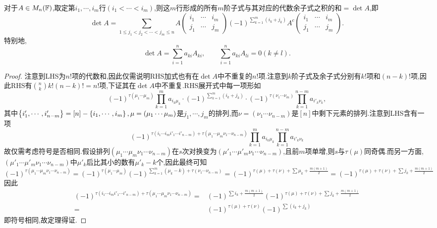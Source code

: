 \documentclass[openany]{book}
\begin{document}
\begin{theorem}[Lapalce展开定理]对于$A\in M_n(\mathbb{F})$,取定第$i_1,\cdots,i_m$行$(i_1<\cdots<i_m)$,则这$m$行形成的所有$m$阶子式与其对应的代数余子式之积的和$=\det A$,即
    $$\det A=\sum_{1\leq j_1<j_2<\cdots<j_m\leq n}A\begin{pmatrix}
    i_1&\cdots&i_m\\j_1&\cdots&j_m
\end{pmatrix}(-1)^{\sum_{k=1}^m(i_k+j_k)}A^c\begin{pmatrix}
    i_1&\cdots&i_m\\j_1&\cdots&j_m
\end{pmatrix}.$$
    特别地,$$\det A=\sum_{i=1}^n a_{ki}A_{ki},\qquad \sum_{i=1}^n a_{ki}A_{li}=0(k\neq l).$$
\end{theorem}
\begin{proof}
    注意到LHS为$n!$项的代数和,因此仅需说明RHS加式也有在$\det A$中不重复的$n!$项.注意到$k$阶子式及余子式分别有$k!$项和$(n-k)!$项,因此RHS有$\binom{n}{k}k!(n-k)!=n!$项,下证其在$\det A$中不重复.RHS展开式中每一项形如
    $$(-1)^{\tau(\mu_1\cdots\mu_m)}\prod_{k=1}^m a_{i_k\mu_k}\cdot (-1)^{\sum_{k=1}^m (i_k+j_k)}\cdot (-1)^{\tau(\nu_1\cdots\nu_m)}\prod_{k=1}^{n-m} a_{i'_k\nu_k},$$
    其中$\left\{i'_1,\cdots,i'_{n-m}\right\}=[n]-\left\{i_1,\cdots,i_m\right\},\mu=(\mu_1\cdots\mu_m)$是$j_1,\cdots,j_m$的排列,而$\nu=(\nu_1\cdots\nu_{n-m})$是$[n]$中剩下元素的排列.注意到LHS含有一项
    $$(-1)^{\tau(i_1\cdots i_mi'_1\cdots i'_{n-m})+\tau(\mu_1\cdots\mu_m\nu_1\cdots\nu_{n-m})}\prod_{k=1}^m a_{i_k\mu_k}\prod_{k=1}^{n-m}a_{i'_k\nu_k}$$
    故仅需考虑符号是否相同.假设排列$(\mu_1\cdots\mu_m\nu_1\cdots\nu_{n-m})$在$s$次对换变为$(\mu'_1\cdots\mu'_m\nu_1\cdots\nu_{n-m})$,且前$m$项单增,则$s$与$\tau(\mu)$同奇偶.而另一方面,$(\mu'_1\cdots\mu'_m\nu_1\cdots\nu_{n-m})$中$\mu'_k$后比其小的数有$\mu'_k-k$个,因此最终可知
    $$(-1)^{\tau(\mu_1\cdots\mu_m\nu_1\cdots\nu_{n-m})}=(-1)^{\tau(\mu_1\cdots\mu_m)}(-1)^{\sum_{k=1}^m(\mu_k-k)+\tau(\nu_1\cdots\nu_{n-m})}=(-1)^{\tau(\mu)+\tau(\nu)+\sum \mu_k+\frac{m(m+1)}{2}}=(-1)^{\tau(\mu)+\tau(\nu)+\sum j_k+\frac{m(m+1)}{2}}$$
    因此$$\begin{aligned}
        (-1)^{\tau(i_1\cdots i_mi'_1\cdots i'_{n-m})+\tau(\mu_1\cdots\mu_m\nu_1\cdots\nu_{n-m})}=&(-1)^{\sum i_k+\frac{m(m+1)}{2}}(-1)^{\tau(\mu)+\tau(\nu)+\sum j_k+\frac{m(m+1)}{2}}\\
        =&(-1)^{\tau(\mu)+\tau(\nu)}(-1)^{\sum(i_k+j_k)}
    \end{aligned}$$
    即符号相同,故定理得证.
\end{proof}
\end{document}

